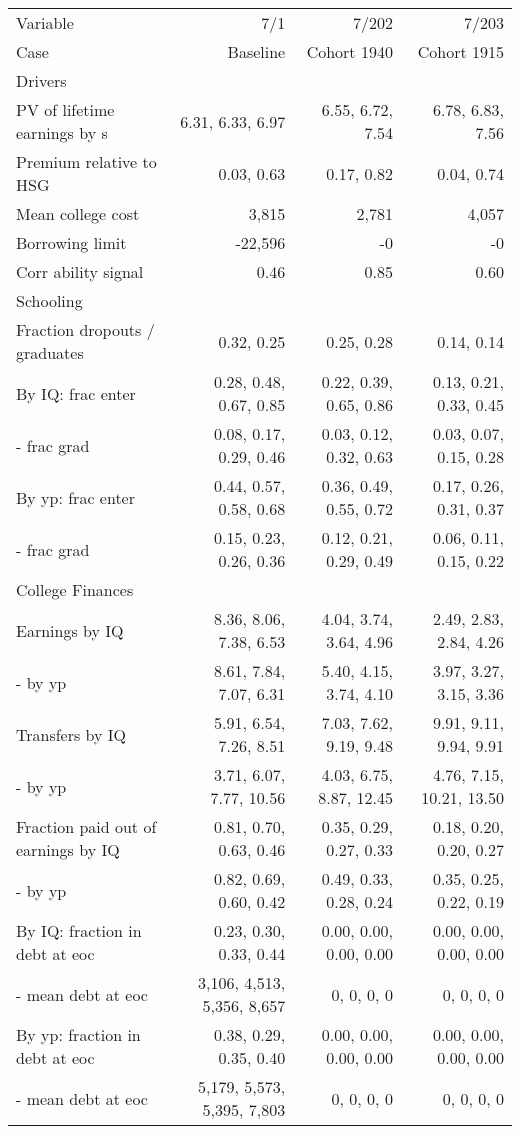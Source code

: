 \begin{tabular}{lrrr}
\hline
Variable & 7/1  & 7/202  & 7/203  \\
Case & Baseline  & Cohort 1940  & Cohort 1915  \\
Drivers &   &   &   \\
PV of lifetime earnings by s & 6.31, 6.33, 6.97  & 6.55, 6.72, 7.54  & 6.78, 6.83, 7.56  \\
Premium relative to HSG & 0.03, 0.63  & 0.17, 0.82  & 0.04, 0.74  \\
Mean college cost & 3,815  & 2,781  & 4,057  \\
Borrowing limit & -22,596  & -0  & -0  \\
Corr ability signal & 0.46  & 0.85  & 0.60  \\
\hline
Schooling &   &   &   \\
Fraction dropouts / graduates & 0.32, 0.25  & 0.25, 0.28  & 0.14, 0.14  \\
By IQ: frac enter & 0.28, 0.48, 0.67, 0.85  & 0.22, 0.39, 0.65, 0.86  & 0.13, 0.21, 0.33, 0.45  \\
- frac grad & 0.08, 0.17, 0.29, 0.46  & 0.03, 0.12, 0.32, 0.63  & 0.03, 0.07, 0.15, 0.28  \\
By yp: frac enter & 0.44, 0.57, 0.58, 0.68  & 0.36, 0.49, 0.55, 0.72  & 0.17, 0.26, 0.31, 0.37  \\
- frac grad & 0.15, 0.23, 0.26, 0.36  & 0.12, 0.21, 0.29, 0.49  & 0.06, 0.11, 0.15, 0.22  \\
\hline
College Finances &   &   &   \\
Earnings by IQ & 8.36, 8.06, 7.38, 6.53  & 4.04, 3.74, 3.64, 4.96  & 2.49, 2.83, 2.84, 4.26  \\
- by yp & 8.61, 7.84, 7.07, 6.31  & 5.40, 4.15, 3.74, 4.10  & 3.97, 3.27, 3.15, 3.36  \\
Transfers by IQ & 5.91, 6.54, 7.26, 8.51  & 7.03, 7.62, 9.19, 9.48  & 9.91, 9.11, 9.94, 9.91  \\
- by yp & 3.71, 6.07, 7.77, 10.56  & 4.03, 6.75, 8.87, 12.45  & 4.76, 7.15, 10.21, 13.50  \\
Fraction paid out of earnings by IQ & 0.81, 0.70, 0.63, 0.46  & 0.35, 0.29, 0.27, 0.33  & 0.18, 0.20, 0.20, 0.27  \\
- by yp & 0.82, 0.69, 0.60, 0.42  & 0.49, 0.33, 0.28, 0.24  & 0.35, 0.25, 0.22, 0.19  \\
By IQ: fraction in debt at eoc & 0.23, 0.30, 0.33, 0.44  & 0.00, 0.00, 0.00, 0.00  & 0.00, 0.00, 0.00, 0.00  \\
- mean debt at eoc & 3,106, 4,513, 5,356, 8,657  & 0, 0, 0, 0  & 0, 0, 0, 0  \\
By yp: fraction in debt at eoc & 0.38, 0.29, 0.35, 0.40  & 0.00, 0.00, 0.00, 0.00  & 0.00, 0.00, 0.00, 0.00  \\
- mean debt at eoc & 5,179, 5,573, 5,395, 7,803  & 0, 0, 0, 0  & 0, 0, 0, 0  \\
\hline
\end{tabular}%
